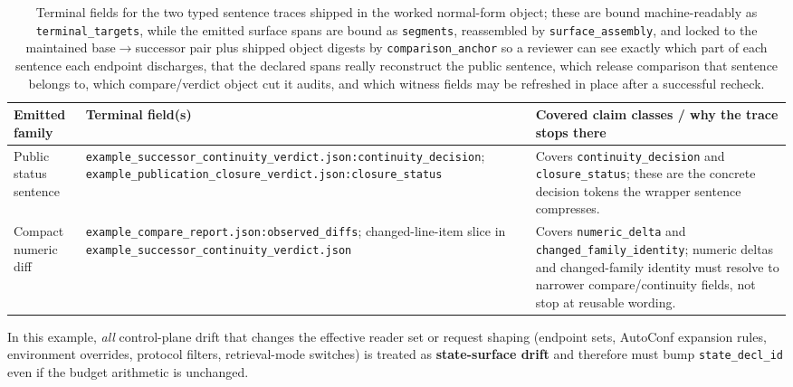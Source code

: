 \documentclass[11pt]{article}
\begin{document}
\begin{table}[t]
\centering
\small
\begin{tabularx}{\linewidth}{@{}l l X@{}}
\toprule
Emitted family & Terminal field(s) & Covered claim classes / why the trace stops there \\
\midrule
Public status sentence & \texttt{example\_successor\_continuity\_verdict.json:continuity\_decision}; \texttt{example\_publication\_closure\_verdict.json:closure\_status} & Covers \texttt{continuity\_decision} and \texttt{closure\_status}; these are the concrete decision tokens the wrapper sentence compresses. \\
Compact numeric diff & \texttt{example\_compare\_report.json:observed\_diffs}; changed-line-item slice in \texttt{example\_successor\_continuity\_verdict.json} & Covers \texttt{numeric\_delta} and \texttt{changed\_family\_identity}; numeric deltas and changed-family identity must resolve to narrower compare/continuity fields, not stop at reusable wording. \\
\bottomrule
\end{tabularx}
\caption{Terminal fields for the two typed sentence traces shipped in the worked normal-form object; these are bound machine-readably as \texttt{terminal\_targets}, while the emitted surface spans are bound as \texttt{segments}, reassembled by \texttt{surface\_assembly}, and locked to the maintained base$\to$successor pair plus shipped object digests by \texttt{comparison\_anchor} so a reviewer can see exactly which part of each sentence each endpoint discharges, that the declared spans really reconstruct the public sentence, which release comparison that sentence belongs to, which compare/verdict object cut it audits, and which witness fields may be refreshed in place after a successful recheck.}
\label{tab:workedexample-trace-endpoints}
\end{table}

In this example, \emph{all} control-plane drift that changes the effective reader set or request shaping (endpoint sets, AutoConf expansion rules, environment overrides, protocol filters, retrieval-mode switches) is treated as \textbf{state-surface drift} and therefore must bump \texttt{state\_decl\_id} even if the budget arithmetic is unchanged.\cite{series:deployedsurfaces,series:planstateequiv}
\end{document}
